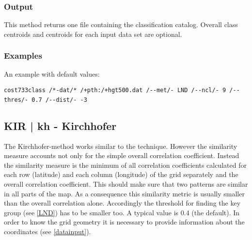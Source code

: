\documentclass[12pt, oneside, a4paper, headsepline, plainheadsepline]{scrbook}
\begin{document}
\subsubsection*{Output}
This method returns one file containing the classification catalog. 
Overall class centroids and centroids for each input data set are optional.

\subsubsection*{Examples}
An example with default values:
\begin{lstlisting}
cost733class /*-dat/* /+pth:/+hgt500.dat /--met/- LND /--ncl/- 9 /--thres/- 0.7 /--dist/- -3
\end{lstlisting}

\subsection{KIR | kh - Kirchhofer}

The Kirchhofer-method \citep{Kirchhofer1974,Blair1998} works similar to the \citet{Lund1963} technique. 
However the similarity measure accounts not only for the simple overall correlation coefficient. 
Instead the similarity measure is the minimum of all correlation coefficients calculated
for each row (latitude) and each column (longitude) of the grid separately and the overall
correlation coefficient. This should make sure that two patterns are similar in all parts
of the map. As a consequence this similarity metric is usually smaller than the overall 
correlation alone. Accordingly the threshold for finding the key group (see \ref{LND}) has to 
be smaller too. A typical value is 0.4 (the default).
In order to know the grid geometry it is necessary to provide information about the coordinates
(see \ref{datainput}).
\end{document}
